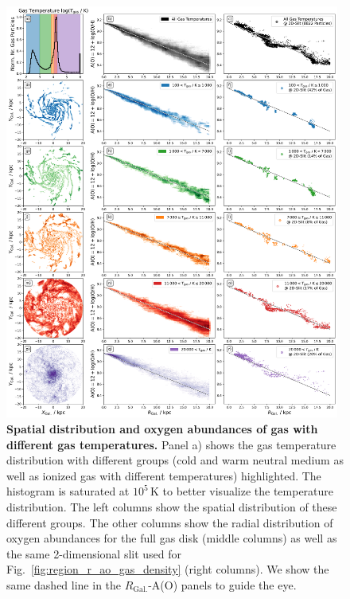\documentclass[twocolumn,apj,numberedappendix,appendixfloats,twocolappendix]{openjournal}
\begin{document}
\begin{figure}
    \centering
    \includegraphics[width=0.98\textwidth]{figures/gas_temperature_tracing_r_ao}
    \caption{\textbf{Spatial distribution and oxygen abundances of gas with different gas temperatures.} Panel a) shows the gas temperature distribution with different groups (cold and warm neutral medium as well as ionized gas with different temperatures) highlighted. The histogram is saturated at $10^5\,\mathrm{K}$ to better visualize the temperature distribution. The left columns show the spatial distribution of these different groups. The other columns show the radial distribution of oxygen abundances for the full gas disk (middle columns) as well as the same 2-dimensional slit used for Fig.~\ref{fig:region_r_ao_gas_density} (right columns). We show the same dashed line in the $R_\mathrm{Gal.}$-A(O) panels to guide the eye.}
    \label{fig:gas_temperature_tracing_r_ao}
\end{figure}

\end{document}
